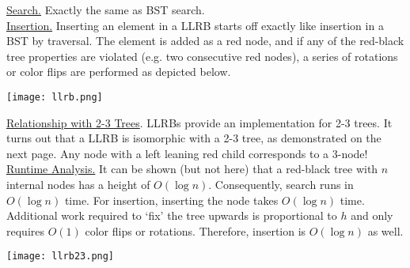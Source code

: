 \documentclass[12pt, fleqn]{general}
\begin{document}
\begin{multicols*}{2}
    \underline{Search.} Exactly the same as BST search.\\

    \underline{Insertion.} Inserting an element in a LLRB starts off exactly like insertion in a BST by traversal. The element is added as a red node, and if any of the red-black tree properties are violated (e.g. two consecutive red nodes), a series of rotations or color flips are performed as depicted below.

    \begin{center}
    \texttt{[image: llrb.png]}
    \end{center}

    \underline{Relationship with 2-3 Trees}. LLRBs provide an implementation for 2-3 trees. It turns out that a LLRB is isomorphic with a 2-3 tree, as demonstrated on the next page. Any node with a left leaning red child corresponds to a 3-node!\\

    \underline{Runtime Analysis.} It can be shown (but not here) that a red-black tree with $n$ internal nodes has a height of $O(\log n)$. Consequently, search runs in $O(\log n)$ time. For insertion, inserting the node takes $O(\log n)$ time. Additional work required to `fix' the tree upwards is proportional to $h$ and only requires $O(1)$ color flips or rotations. Therefore, insertion is $O(\log n)$ as well.



    \end{multicols*}
    \newpage
    \texttt{[image: llrb23.png]}
    \newpage
\end{document}
